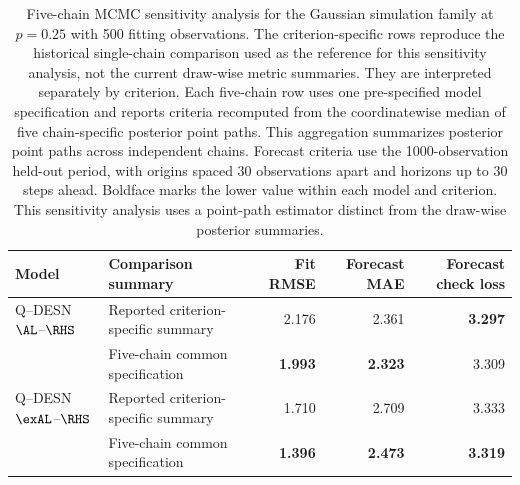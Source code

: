 \begin{table}[!htbp]
\centering
\small
\setlength{\tabcolsep}{3pt}
\begin{tabular}{@{}llrrr@{}}
\toprule
Model & Comparison summary & Fit RMSE & Forecast MAE & Forecast check loss \\
\midrule
Q--DESN \(\AL\)--\(\RHS\)
  & Reported criterion-specific summary & 2.176 & 2.361 & \textbf{3.297} \\
  & Five-chain common specification & \textbf{1.993} & \textbf{2.323} & 3.309 \\
\addlinespace
Q--DESN \(\exAL\)--\(\RHS\)
  & Reported criterion-specific summary & 1.710 & 2.709 & 3.333 \\
  & Five-chain common specification & \textbf{1.396} & \textbf{2.473} & \textbf{3.319} \\
\bottomrule
\end{tabular}
\caption{Five-chain MCMC sensitivity analysis for the Gaussian simulation
family at \(p=0.25\) with 500 fitting observations. The criterion-specific rows
reproduce the historical single-chain comparison used as the reference for
this sensitivity analysis, not the current draw-wise metric summaries.
They are interpreted separately by criterion. Each five-chain row uses one
pre-specified model specification and reports criteria recomputed from
the coordinatewise median of five chain-specific posterior point paths. This
aggregation summarizes posterior point paths across independent chains.
Forecast criteria use the 1000-observation held-out period, with origins spaced
30 observations apart and horizons up to 30 steps ahead. Boldface
marks the lower value within each model and criterion. This sensitivity analysis
uses a point-path estimator distinct from the draw-wise posterior summaries.}
\label{tab:supp-independent-mcmc-five-chain-sensitivity}
\end{table}
